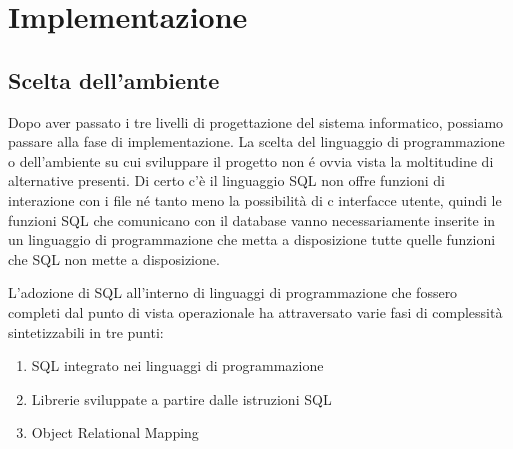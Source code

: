 \documentclass[12pt,a4paper,onecolumn,x11names]{article}
\begin{document}
\section{Implementazione}
	\subsection{Scelta dell'ambiente}
	\begin{flushleft}
		Dopo aver passato i tre livelli di progettazione del sistema informatico, possiamo passare alla fase di implementazione. La scelta del linguaggio di programmazione o dell'ambiente su cui sviluppare il progetto non \'{e} ovvia vista la moltitudine di alternative presenti. \newline
		Di certo c'è il linguaggio SQL non offre funzioni di interazione con i file n\'{e} tanto meno la possibilità di c interfacce utente, quindi le funzioni SQL che comunicano con il database vanno necessariamente inserite in un linguaggio di programmazione che metta a disposizione tutte quelle funzioni che SQL non mette a disposizione.\newline
		
		L'adozione di SQL all'interno di linguaggi di programmazione che fossero completi dal punto di vista operazionale ha attraversato varie fasi di complessità sintetizzabili in tre punti:
	\end{flushleft}
	\begin{enumerate}
		\item SQL integrato nei linguaggi di programmazione
		\item Librerie sviluppate a partire dalle istruzioni SQL
		\item Object Relational Mapping
	\end{enumerate}
\end{document}

